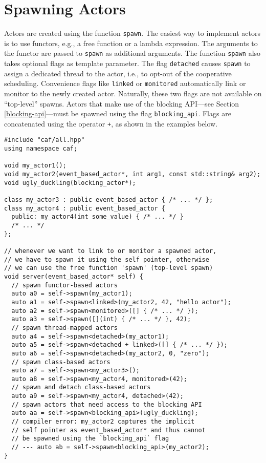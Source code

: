 \section{Spawning Actors}

Actors are created using the function \lstinline^spawn^.
The easiest way to implement actors is to use functors, e.g., a free function or a lambda expression.
The arguments to the functor are passed to \lstinline^spawn^ as additional arguments.
The function \lstinline^spawn^ also takes optional flags as template parameter.
The flag \lstinline^detached^ causes \lstinline^spawn^ to assign a dedicated thread to the actor, i.e., to opt-out of the cooperative scheduling.
Convenience flags like \lstinline^linked^ or \lstinline^monitored^ automatically link or monitor to the newly created actor.
Naturally, these two flags are not available on ``top-level'' spawns.
Actors that make use of the blocking API---see Section \ref{blocking-api}---must be spawned using the flag \lstinline^blocking_api^.
Flags are concatenated using the operator \lstinline^+^, as shown in the examples below.

\begin{lstlisting}
#include "caf/all.hpp"
using namespace caf;

void my_actor1();
void my_actor2(event_based_actor*, int arg1, const std::string& arg2);
void ugly_duckling(blocking_actor*);

class my_actor3 : public event_based_actor { /* ... */ };
class my_actor4 : public event_based_actor {
  public: my_actor4(int some_value) { /* ... */ }
  /* ... */
};

// whenever we want to link to or monitor a spawned actor,
// we have to spawn it using the self pointer, otherwise
// we can use the free function 'spawn' (top-level spawn)
void server(event_based_actor* self) {
  // spawn functor-based actors
  auto a0 = self->spawn(my_actor1);
  auto a1 = self->spawn<linked>(my_actor2, 42, "hello actor");
  auto a2 = self->spawn<monitored>([] { /* ... */ });
  auto a3 = self->spawn([](int) { /* ... */ }, 42);
  // spawn thread-mapped actors
  auto a4 = self->spawn<detached>(my_actor1);
  auto a5 = self->spawn<detached + linked>([] { /* ... */ });
  auto a6 = self->spawn<detached>(my_actor2, 0, "zero");
  // spawn class-based actors
  auto a7 = self->spawn<my_actor3>();
  auto a8 = self->spawn<my_actor4, monitored>(42);
  // spawn and detach class-based actors
  auto a9 = self->spawn<my_actor4, detached>(42);
  // spawn actors that need access to the blocking API
  auto aa = self->spawn<blocking_api>(ugly_duckling);
  // compiler error: my_actor2 captures the implicit
  // self pointer as event_based_actor* and thus cannot
  // be spawned using the `blocking_api` flag
  // --- auto ab = self->spawn<blocking_api>(my_actor2);
}
\end{lstlisting}


